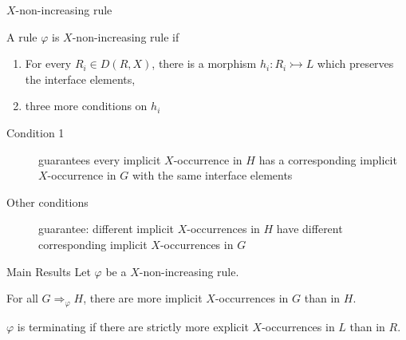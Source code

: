 \documentclass{beamer}
\begin{document}
\begin{frame}{$X$-non-increasing rule}
 \begin{definition}
    A rule $\varphi$ is $X$-non-increasing rule if 
    \begin{enumerate}
        \item For every $R_i \mathop{\in} D(R,X)$, there is a morphism \(h_i: R_i \rightarrowtail L \) which preserves the interface elements,
        \item three more conditions on $h_i$
    \end{enumerate}  
 \end{definition}

    \begin{description}
    \item[Condition 1] guarantees every implicit $X$-occurrence in $H$ has a corresponding implicit $X$-occurrence in $G$ with the same interface elements

        \item[Other conditions] guarantee: different implicit $X$-occurrences in $H$ have different corresponding implicit $X$-occurrences in $G$
\end{description} 
\end{frame}

\begin{frame}{Main Results}
    Let $\varphi$ be a $X$-non-increasing rule.
    \begin{lemma}
        For all $G \mathop{\Rightarrow}_\varphi H$, there are more implicit $X$-occurrences in $G$ than in $H$.
    \end{lemma}
         
    \begin{theorem}
        $\varphi$ is terminating if there are strictly more explicit $X$-occurrences in $L$ than in $R$.
    \end{theorem}

\end{frame}
\end{document}
